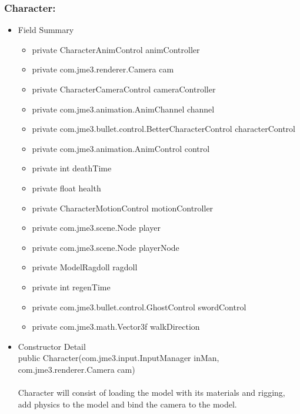 \documentclass[letterpaper]{article}
\begin{document}
								\vspace{0.2in}
								\subsubsection*{Character:}
								\vspace{0.1in}
									\begin{itemize}
										\item	Field Summary
												\begin{itemize}
													\item	private CharacterAnimControl	animController 
													\item	private com.jme3.renderer.Camera	cam 
													\item	private CharacterCameraControl	cameraController 
													\item	private com.jme3.animation.AnimChannel	channel 
													\item	private com.jme3.bullet.control.BetterCharacterControl	characterControl 
													\item	private com.jme3.animation.AnimControl	control 
													\item	private int	deathTime 
													\item	private float	health 
													\item	private CharacterMotionControl	motionController 
													\item	private com.jme3.scene.Node	player 
													\item	private com.jme3.scene.Node	playerNode 
													\item	private ModelRagdoll	ragdoll 
													\item	private int	regenTime 
													\item	private com.jme3.bullet.control.GhostControl	swordControl 
													\item	private com.jme3.math.Vector3f	walkDirection  
												\end{itemize}
										\item	Constructor Detail \\
												public Character(com.jme3.input.InputManager inMan, \\
				        com.jme3.renderer.Camera cam) \\ \\
												Character will consist of loading the model with its materials and rigging, add physics to the model and bind the camera to the model. \\ \\

\end{itemize}
\end{document}
